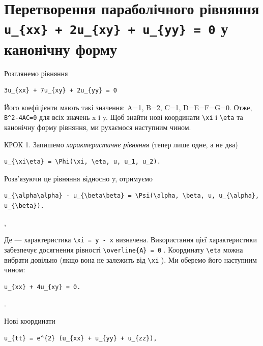 \documentclass[
  ukrainian,
]{article}
\begin{document}
\section{\texorpdfstring{Перетворення параболічного рівняння
\texttt{u\_\{xx\}\ +\ 2u\_\{xy\}\ +\ u\_\{yy\}\ =\ 0} у канонічну
форму}{Перетворення параболічного рівняння u\_\{xx\} + 2u\_\{xy\} + u\_\{yy\} = 0 у канонічну форму}}\label{ux43fux435ux440ux435ux442ux432ux43eux440ux435ux43dux43dux44f-ux43fux430ux440ux430ux431ux43eux43bux456ux447ux43dux43eux433ux43e-ux440ux456ux432ux43dux44fux43dux43dux44f-u_xx-2u_xy-u_yy-0-ux443-ux43aux430ux43dux43eux43dux456ux447ux43dux443-ux444ux43eux440ux43cux443}

Розглянемо рівняння

\begin{verbatim}
3u_{xx} + 7u_{xy} + 2u_{yy} = 0
\end{verbatim}

Його коефіцієнти мають такі значення: A=1, B=2, C=1, D=E=F=G=0. Отже,
\texttt{B\^{}2-4AC=0} для всіх значень x і y. Щоб знайти нові координати
\texttt{\textbackslash{}xi} і \texttt{\textbackslash{}eta} та канонічну
форму рівняння, ми рухаємося наступним чином.

КРОК 1. Запишемо \emph{характеристичне рівняння} (тепер лише одне, а не
два)

\begin{verbatim}
u_{\xi\eta} = \Phi(\xi, \eta, u, u_1, u_2).
\end{verbatim}

Розв'язуючи це рівняння відносно y, отримуємо

\begin{verbatim}
u_{\alpha\alpha} - u_{\beta\beta} = \Psi(\alpha, \beta, u, u_{\alpha}, u_{\beta}).
\end{verbatim}

,

Де --- характеристика \texttt{\textbackslash{}xi\ =\ y\ -\ x} визначена.
Використання цієї характеристики забезпечує досягнення рівності
\texttt{\textbackslash{}overline\{A\}\ =\ 0} . Координату
\texttt{\textbackslash{}eta} можна вибрати довільно (якщо вона не
залежить від \texttt{\textbackslash{}xi} ). Ми оберемо його наступним
чином:

\begin{verbatim}
u_{xx} + 4u_{xy} = 0.
\end{verbatim}

.

Нові координати

\begin{verbatim}
u_{tt} = e^{2} (u_{xx} + u_{yy} + u_{zz}),
\end{verbatim}
\end{document}
